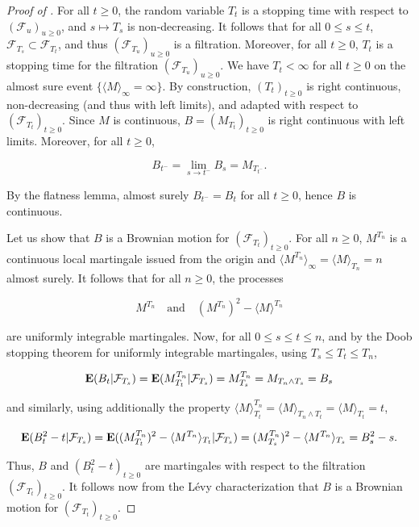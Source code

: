 \begin{proof}[Proof of ]
    For all \( t \geq 0 \), the random variable \( T_t \) is a stopping time with respect to \( (\mathcal{F}_u)_{u \geq 0} \), and \( s \mapsto T_s \) is non-decreasing. It follows that for all \( 0 \leq s \leq t \), \( \mathcal{F}_{T_s} \subset \mathcal{F}_{T_t} \), and thus \( (\mathcal{F}_{T_u})_{u \geq 0} \) is a filtration. Moreover, for all \( t \geq 0 \), \( T_t \) is a stopping time for the filtration \( (\mathcal{F}_{T_u})_{u \geq 0} \). We have \( T_t < \infty \) for all \( t \geq 0 \) on the almost sure event \( \{ \langle M \rangle_\infty = \infty \} \). By construction, \( (T_t)_{t \geq 0} \) is right continuous, non-decreasing (and thus with left limits), and adapted with respect to \( (\mathcal{F}_{T_t})_{t \geq 0} \). Since \( M \) is continuous, \( B = (M_{T_t})_{t \geq 0} \) is right continuous with left limits. Moreover, for all \( t \geq 0 \),

\[
B_{t^-} = \lim_{s \to t^-} B_s = M_{T_{t^-}}.
\]

By the flatness lemma, almost surely \( B_{t^-} = B_t \) for all \( t \geq 0 \), hence \( B \) is continuous.

Let us show that \( B \) is a Brownian motion for \( (\mathcal{F}_{T_t})_{t \geq 0} \). For all \( n \geq 0 \), \( M^{T_n} \) is a continuous local martingale issued from the origin and \( \langle M^{T_n} \rangle_\infty = \langle M \rangle_{T_n} = n \) almost surely. It follows that for all \( n \geq 0 \), the processes

\[
M^{T_n} \quad \text{and} \quad (M^{T_n})^2 - \langle M \rangle^{T_n}
\]

are uniformly integrable martingales. Now, for all \( 0 \leq s \leq t \leq n \), and by the Doob stopping theorem for uniformly integrable martingales, using \( T_s \leq T_t \leq T_n \),

\[
{\mathbf E} (B_t | \mathcal{F}_{T_s}) = {\mathbf E} (M_{T_t}^{T_n} | \mathcal{F}_{T_s}) = M_{T_s}^{T_n} = M_{T_n \wedge T_s} = B_s
\]

and similarly, using additionally the property \( \langle M \rangle_{T_t}^{T_n} = \langle M \rangle_{T_n \wedge T_t} = \langle M \rangle_{T_t} = t \),

\[
{\mathbf E} (B_t^2 - t | \mathcal{F}_{T_s}) = {\mathbf E} ((M_{T_t}^{T_n})^2 - \langle M^{T_n} \rangle_{T_t} | \mathcal{F}_{T_s}) = (M_{T_s}^{T_n})^2 - \langle M^{T_n} \rangle_{T_s} = B_s^2 - s.
\]

Thus, \( B \) and \( (B_t^2 - t)_{t \geq 0} \) are martingales with respect to the filtration \( (\mathcal{F}_{T_t})_{t \geq 0} \). It follows now from the Lévy characterization that \( B \) is a Brownian motion for \( (\mathcal{F}_{T_t})_{t \geq 0} \).


\end{proof}
